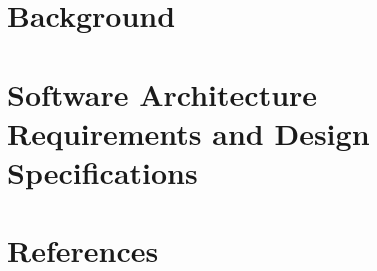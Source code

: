 \documentclass[a4paper,12pt, margin=1.5in]{article}
\begin{document}
	\section{Background}	
	
	
	\section{Software Architecture Requirements and Design Specifications}
	
	
	\section{References}
	
\end{document}
